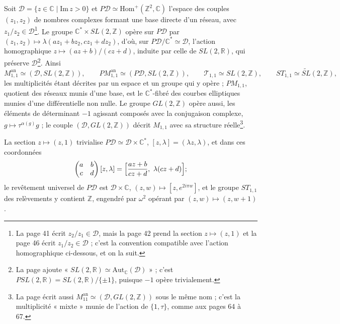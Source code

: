 \documentclass[11pt,a4paper]{article}
\begin{document}
Soit $\mathcal{D} = \{z \in \mathbb{C} \mid \mathrm{Im}\, z > 0\}$ et
$P\mathcal{D} \simeq \mathrm{Hom}^{+}(\mathbb{Z}^2, \mathbb{C})$ l'espace des
couples $(z_1, z_2)$ de nombres complexes formant une base directe d'un réseau,
avec $z_1/z_2 \in \mathcal{D}$\footnote{La page 41 écrit
$z_2/z_1 \in \mathcal{D}$, mais la page 42 prend la section $z \mapsto (z, 1)$
et la page 46 écrit $z_1/z_2 \in \mathcal{D}$ ; c'est la convention
compatible avec l'action homographique ci-dessous, et on la suit.}. Le groupe
$\mathbb{C}^* \times SL(2, \mathbb{Z})$ opère sur $P\mathcal{D}$ par
$(z_1, z_2) \mapsto \lambda(az_1 + bz_2, cz_1 + dz_2)$, d'où, sur
$P\mathcal{D}/\mathbb{C}^* \simeq \mathcal{D}$, l'action homographique
$z \mapsto (az+b)/(cz+d)$, induite par celle de $SL(2, \mathbb{R})$, qui
préserve $\mathcal{D}$\footnote{La page ajoute
« $SL(2, \mathbb{R}) \simeq \mathrm{Aut}_{\mathbb{C}}(\mathcal{D})$ » ; c'est
$PSL(2, \mathbb{R}) = SL(2, \mathbb{R})/\{\pm 1\}$, puisque $-1$ opère
trivialement.}. Ainsi
\[
M_{1,1}^{\mathrm{an}} \simeq (\mathcal{D}, SL(2, \mathbb{Z})), \qquad
PM_{1,1}^{\mathrm{an}} \simeq (P\mathcal{D}, SL(2, \mathbb{Z})), \qquad
\mathcal{T}_{1,1} \simeq SL(2, \mathbb{Z}), \qquad ST_{1,1} \simeq \widetilde{SL}(2, \mathbb{Z}),
\]
les multiplicités étant décrites par un espace et un groupe qui y opère ;
$PM_{1,1}$, quotient des réseaux munis d'une base, est le
$\mathbb{C}^*$-fibré des courbes elliptiques munies d'une différentielle non
nulle. Le groupe $GL(2, \mathbb{Z})$ opère aussi, les
éléments de déterminant $-1$ agissant composés avec la conjugaison complexe,
$g \mapsto \tau^{\alpha(g)} g$ ; le couple $(\mathcal{D}, GL(2, \mathbb{Z}))$
décrit $M_{1,1}$ avec sa structure réelle\footnote{La page écrit aussi
$M_{11}^{\mathrm{an}} \simeq (\mathcal{D}, GL(2, \mathbb{Z}))$ sous le même
nom ; c'est la multiplicité « mixte » munie de l'action de $\{1, \tau\}$,
comme aux pages 64 à 67.}.

La section $z \mapsto (z, 1)$ trivialise $P\mathcal{D} \simeq \mathcal{D} \times \mathbb{C}^*$,
$[z, \lambda] = (\lambda z, \lambda)$, et dans ces coordonnées
\[
\begin{pmatrix} a & b \\ c & d \end{pmatrix} [z, \lambda] = \Bigl[\frac{az+b}{cz+d},\ \lambda(cz+d)\Bigr] ;
\]
le revêtement universel de $P\mathcal{D}$ est $\mathcal{D} \times \mathbb{C}$,
$(z, w) \mapsto [z, e^{2i\pi w}]$, et le groupe $ST_{1,1}$ des relèvements y
contient $\mathbb{Z}$, engendré par $\omega^2$ opérant par $(z, w) \mapsto (z, w+1)$.
\end{document}
